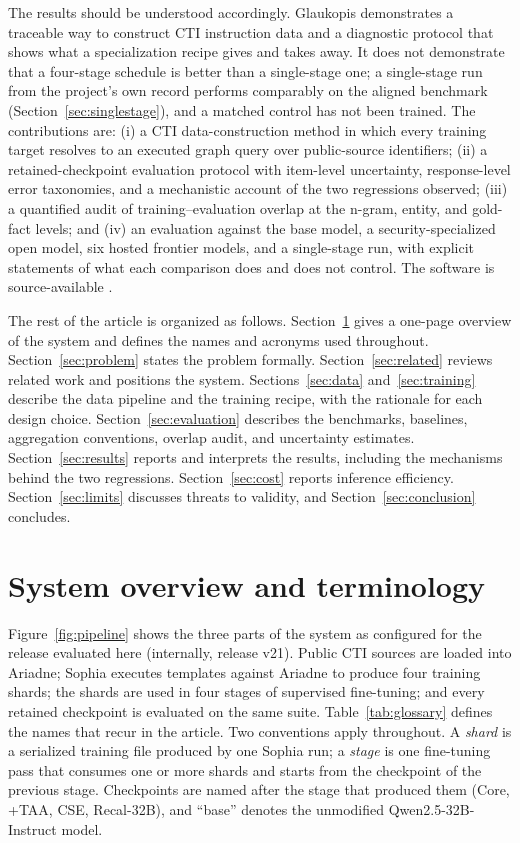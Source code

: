 \documentclass[preprint,12pt,authoryear]{elsarticle}
\begin{document}
The results should be understood accordingly. Glaukopis demonstrates a traceable way to construct CTI instruction data and a diagnostic protocol that shows what a specialization recipe gives and takes away. It does not demonstrate that a four-stage schedule is better than a single-stage one; a single-stage run from the project's own record performs comparably on the aligned benchmark (Section~\ref{sec:singlestage}), and a matched control has not been trained. The contributions are: (i) a CTI data-construction method in which every training target resolves to an executed graph query over public-source identifiers; (ii) a retained-checkpoint evaluation protocol with item-level uncertainty, response-level error taxonomies, and a mechanistic account of the two regressions observed; (iii) a quantified audit of training--evaluation overlap at the n-gram, entity, and gold-fact levels; and (iv) an evaluation against the base model, a security-specialized open model, six hosted frontier models, and a single-stage run, with explicit statements of what each comparison does and does not control. The software is source-available \citep{glaukopis2026software}.

The rest of the article is organized as follows. Section~\ref{sec:overview} gives a one-page overview of the system and defines the names and acronyms used throughout. Section~\ref{sec:problem} states the problem formally. Section~\ref{sec:related} reviews related work and positions the system. Sections~\ref{sec:data} and~\ref{sec:training} describe the data pipeline and the training recipe, with the rationale for each design choice. Section~\ref{sec:evaluation} describes the benchmarks, baselines, aggregation conventions, overlap audit, and uncertainty estimates. Section~\ref{sec:results} reports and interprets the results, including the mechanisms behind the two regressions. Section~\ref{sec:cost} reports inference efficiency. Section~\ref{sec:limits} discusses threats to validity, and Section~\ref{sec:conclusion} concludes.

\section{System overview and terminology}\label{sec:overview}
Figure~\ref{fig:pipeline} shows the three parts of the system as configured for the release evaluated here (internally, release v21). Public CTI sources are loaded into Ariadne; Sophia executes templates against Ariadne to produce four training shards; the shards are used in four stages of supervised fine-tuning; and every retained checkpoint is evaluated on the same suite. Table~\ref{tab:glossary} defines the names that recur in the article. Two conventions apply throughout. A \emph{shard} is a serialized training file produced by one Sophia run; a \emph{stage} is one fine-tuning pass that consumes one or more shards and starts from the checkpoint of the previous stage. Checkpoints are named after the stage that produced them (Core, +TAA, CSE, Recal-32B), and ``base'' denotes the unmodified Qwen2.5-32B-Instruct model.
\end{document}
